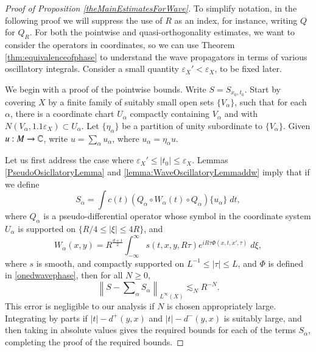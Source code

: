 \begin{proof}[Proof of Proposition \ref{theMainEstimatesForWave}]

To simplify notation, in the following proof we will suppress the use of $R$ as an index, for instance, writing $Q$ for $Q_R$. For both the pointwise and quasi-orthogonality estimates, we want to consider the operators in coordinates, so we can use Theorem \ref{thm:equivalenceofphase} to understand the wave propagators in terms of various oscillatory integrals. Consider a small quantity $\varepsilon_X' < \varepsilon_X$, to be fixed later.

We begin with a proof of the pointwise bounds. Write $S = S\!_{x_0,t_0}$. Start by covering $X$ by a finite family of suitably small open sets $\{ V_\alpha \}$, such that for each $\alpha$, there is a coordinate chart $U_\alpha$ compactly containing $V_\alpha$ and with $N(V_\alpha, 1.1 \varepsilon_X) \subset U_\alpha$. Let $\{ \eta_\alpha \}$ be a partition of unity subordinate to $\{ V_\alpha \}$. Given $u: M \to \operatorname{\mathbb{C}}$, write $u = \sum_\alpha u_\alpha$, where $u_\alpha = \eta_\alpha u$.

Let us first address the case where $\varepsilon_X' \leq |t_0| \leq \varepsilon_X$. Lemmas \ref{PseudoOsicllatoryLemma} and \ref{lemma:WaveOscillatoryLemmaddw} imply that if we define
%
\begin{equation}
    S\!_\alpha = \int c(t) (Q_\alpha \circ W_\alpha(t) \circ Q_\alpha) \{ u_\alpha \}\; dt,
\end{equation}
%
where $Q_\alpha$ is a pseudo-differential operator whose symbol in the coordinate system $U_\alpha$ is supported on $\{ R/4 \leq |\xi| \leq 4R \}$, and
%
\[ W_\alpha(x,y) = R^{\frac{d+1}{2}} \int_{-\infty}^\infty s(t,x,y,R\tau) e^{i R \tau \Phi(x,t,x',\tau)}\; d\xi, \]
% 
% 
where $s$ is smooth, and compactly supported on $L^{-1} \leq |\tau| \leq L$, and $\Phi$ is defined in \eqref{onedwavephase}, then for all $N \geq 0$,
%
\begin{equation} \label{parametrixerrroestimate}
    \left\| S - \textstyle\sum\nolimits_\alpha S\!_\alpha \right\|_{L^\infty(X)} \lesssim_N R^{-N}.
\end{equation}
%
This error is negligible to our analysis if $N$ is chosen appropriately large. Integrating by parts if $|t| - d^+(y,x)$ and $|t| - d^-(y,x)$ is suitably large, and then taking in absolute values gives the required bounds for each of the terms $S\!_\alpha$, completing the proof of the required bounds.



\end{proof}
